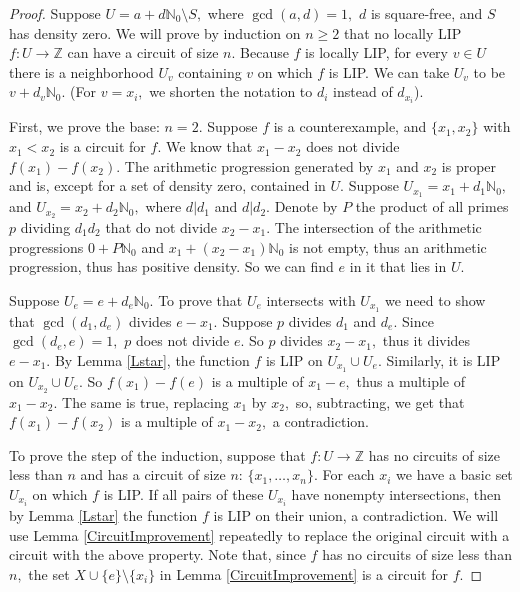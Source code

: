 \documentclass[10pt]{article}
\theoremstyle{definition}
\begin{document}
\begin{proof} Suppose $U=a+d\mathbb N_0\setminus S,$ where $\gcd (a,d)=1,$ $d$ is square-free, and $S$ has density zero. We will prove by induction on $n\geq 2$ that no locally LIP $f:U\to \mathbb Z$ can have a circuit of size $n.$ Because $f$ is locally LIP, for every $v\in U$ there is a neighborhood $U_v$ containing $v$ on which $f$ is LIP. We can take $U_v$ to be $v+d_v\mathbb N_0.$ (For $v=x_i,$ we shorten the notation to $d_i$ instead of $d_{x_i}$).

First, we prove the base: $n=2.$ Suppose $f$ is a counterexample, and $\{x_1,x_2\}$ with $x_1<x_2$ is a circuit for $f.$ We know that $x_1-x_2$ does not divide $f(x_1)-f(x_2).$ 
The arithmetic progression generated by $x_1$ and $x_2$ is proper and is, except for a set of density zero, contained in $U.$ Suppose $U_{x_1}=x_1+d_1\mathbb N_0,$ and  $U_{x_2}=x_2+d_2\mathbb N_0,$ where $d|d_1$ and $d|d_2.$ Denote by $P$ the product of all primes $p$ dividing $d_1d_2$ that do not divide $x_2-x_1.$ The intersection of the arithmetic progressions $0+P \mathbb N_0$ and $x_1+(x_2-x_1)\mathbb N_0$ is not empty, thus an arithmetic progression, thus has positive density. So we can find $e$ in it that lies in $U.$

Suppose $U_e=e+d_e\mathbb N_0.$ To prove that $U_e$ intersects with $U_{x_1}$ we need to show that $\gcd (d_1,d_e)$ divides $e-x_1.$ Suppose $p$ divides $d_1$ and $d_e.$ Since $\gcd(d_e,e)=1,$ $p$ does not divide $e.$ So $p$ divides $x_2-x_1,$ thus it divides $e-x_1.$ By Lemma \ref{Lstar}, the function $f$ is LIP on $U_{x_1}\cup U_e.$ Similarly, it is LIP on  $U_{x_2}\cup U_e.$ So $f(x_1)-f(e)$ is a multiple of $x_1-e,$ thus a multiple of $x_1-x_2.$ The same is true, replacing $x_1$ by $x_2,$ so, subtracting, we get that $f(x_1)-f(x_2)$ is a multiple of $x_1-x_2,$ a contradiction. 

To prove the step of the induction, suppose that $f:U \to \mathbb Z$ has no circuits of size less than $n$ and has a circuit of size $n$: $\{x_1,\dots, x_n\}.$ For each $x_i$ we have a basic set $U_{x_i}$ on which $f$ is LIP. If all pairs of these $U_{x_i}$ have nonempty intersections, then by Lemma \ref{Lstar} the function $f$ is LIP on their union, a contradiction. We will use Lemma \ref{CircuitImprovement} repeatedly to replace the original circuit with a circuit with the above property. Note that, since $f$ has no circuits of size less than $n,$ the set $X\cup \{e\} \setminus\{x_i\}$ in Lemma \ref{CircuitImprovement} is a circuit for $f.$


\end{proof}
\end{document}
